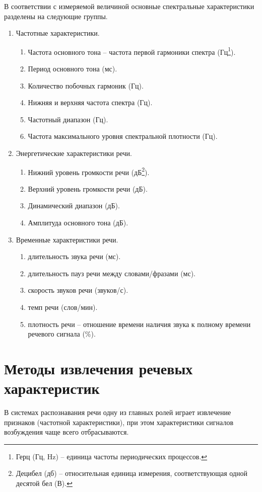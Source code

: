 В соответствии с измеряемой величиной основные спектральные характеристики разделены на следующие группы. \cite{chastot} \cite{chastot2} \cite{signal}
\begin{enumerate}
	\item Частотные характеристики.
	\begin{enumerate}
		\item Частота основного тона -- частота первой гармоники спектра (Гц\footnote{Герц (Гц, Hz) -- единица частоты периодических процессов.}).
		\item Период основного тона (мс).
		\item Количество побочных гармоник (Гц).
		\item Нижняя и верхняя частота спектра (Гц).
		\item Частотный диапазон (Гц).
		\item Частота максимального уровня спектральной плотности (Гц).
	\end{enumerate}
	\item Энергетические характеристики речи.
	\begin{enumerate}
		\item Нижний уровень громкости речи (дБ\footnote{Децибел (дб) --  относительная единица измерения, соответствующая одной десятой бел (В).}).
		\item Верхний уровень громкости речи (дБ).
		\item Динамический диапазон (дБ).
		\item Амплитуда основного тона (дБ).
	\end{enumerate}
	\item Временные характеристики речи.
	\begin{enumerate}
		\item длительность звука речи (мс).
		\item длительность пауз речи между словами/фразами (мс).
		\item скорость звуков речи (звуков/с).
		\item темп речи (слов/мин).
		\item плотность речи -- отношение времени наличия звука к
		полному времени речевого сигнала (\%).
	\end{enumerate}
\end{enumerate}

\section{Методы извлечения речевых характеристик}
В системах распознавания речи одну из главных ролей играет извлечение признаков (частотной характеристики), при этом характеристики сигналов возбуждения чаще всего отбрасываются. 


